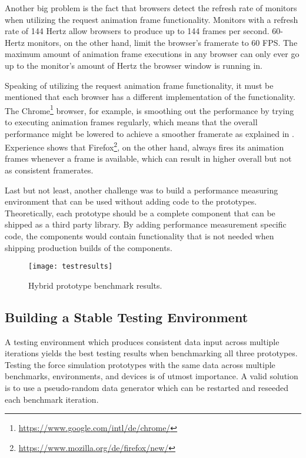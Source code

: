 Another big problem is the fact that browsers detect the refresh rate of monitors when utilizing the request animation frame functionality. Monitors with a refresh rate of 144 Hertz allow browsers to produce up to 144 frames per second. 60-Hertz monitors, on the other hand, limit the browser's framerate to 60 FPS. The maximum amount of animation frame executions in any browser can only ever go up to the monitor's amount of Hertz the browser window is running in. 

Speaking of utilizing the request animation frame functionality, it must be mentioned that each browser has a different implementation of the functionality. The Chrome\footnote{\url{https://www.google.com/intl/de/chrome/}} browser, for example, is smoothing out the performance by trying to executing animation frames regularly, which means that the overall performance might be lowered to achieve a smoother framerate as explained in \cite{ChromeRAF}. Experience shows that Firefox\footnote{\url{https://www.mozilla.org/de/firefox/new/}}, on the other hand, always fires its animation frames whenever a frame is available, which can result in higher overall but not as consistent framerates.

Last but not least, another challenge was to build a performance measuring environment that can be used without adding code to the prototypes. Theoretically, each prototype should be a complete component that can be shipped as a third party library. By adding performance measurement specific code, the components would contain functionality that is not needed when shipping production builds of the components.

\begin{figure}
  \centering
  \texttt{[image: testresults]}
  \caption{Hybrid prototype benchmark results.}
  \label{fig:reactD3benchResult}
\end{figure}

\subsection{Building a Stable Testing Environment}
\label{sub:perfImplDetails}

A testing environment which produces consistent data input across multiple iterations yields the best testing results when benchmarking all three prototypes. Testing the force simulation prototypes with the same data across multiple benchmarks, environments, and devices is of utmost importance. A valid solution is to use a pseudo-random data generator which can be restarted and reseeded each benchmark iteration.

